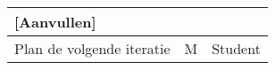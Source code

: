 \documentclass[a4paper, 11pt, oneside]{article}
\begin{document}
\begin{table}[H]
\begin{tabular}{|l|l|l|}
		{[}Aanvullen{]}                                                                                                                                                               &                                                                   &                                                                               \\ \hline
		Plan de volgende iteratie                                                                                                                                                     & M                                                                 & Student                                                                       \\ \hline
	\end{tabular}
\end{table}
\end{document}
